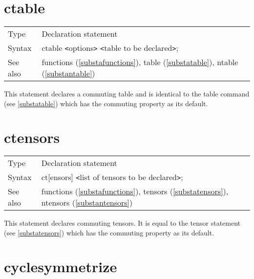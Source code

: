 
\section{ctable}
\label{substactable}

\noindent \begin{tabular}{ll}
Type & Declaration statement\\
Syntax & ctable {\tt<}options{\tt>} {\tt<}table to be 
declared{\tt>}; \\
See also & functions (\ref{substafunctions}), table (\ref{substatable}),
        ntable (\ref{substantable})
\end{tabular} \vspace{4mm}

\noindent This statement declares a commuting 
table and is identical to the table command (see 
\ref{substatable}) which has the commuting property as its default. 
\vspace{10mm}

 
\section{ctensors}
\label{substactensors}

\noindent \begin{tabular}{ll}
Type & Declaration statement\\
Syntax & ct[ensors] {\tt<}list of tensors to be declared{\tt>}; \\
See also & functions (\ref{substafunctions}), tensors 
        (\ref{substatensors}), ntensors (\ref{substantensors})
\end{tabular} \vspace{4mm}

\noindent This statement declares commuting 
tensors. It is equal to the tensor statement (see 
\ref{substatensors}) which has the commuting property as its default. 
\vspace{10mm}


\section{cyclesymmetrize}
\label{substacyclesymmetrize}

